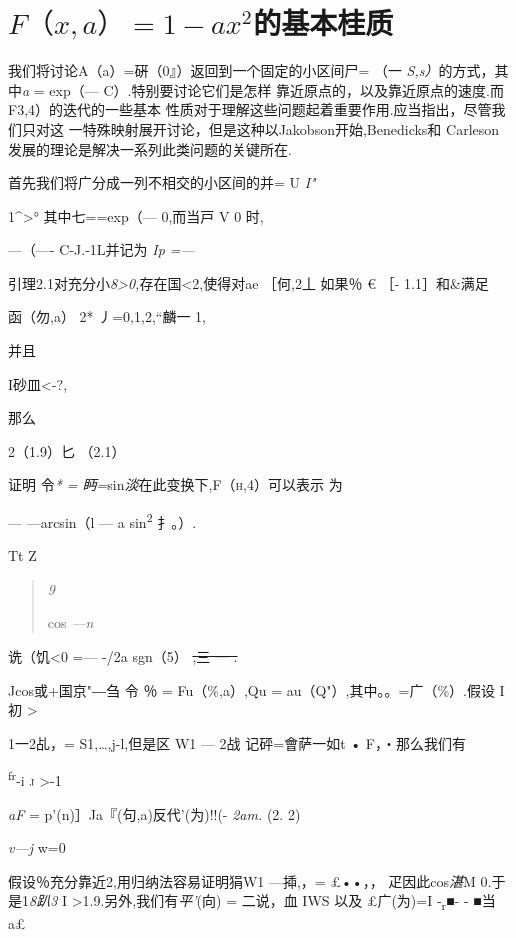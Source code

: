 \section{$ F（x,a） = 1 - ax^2$的基本桂质}


我们将讨论A（a）=硏（0』）返回到一个固定的小区间尸= （一
\emph{S,s）}的方式，其中\emph{a} = exp（--- C）.特别要讨论它们是怎样
靠近原点的，以及靠近原点的速度.而F3,4）的迭代的一些基本
性质对于理解这些问题起着重要作用.应当指出，尽管我们只对这
一特殊映射展开讨论，但是这种以Jakobson开始,Benedicks和
Carleson发展的理论是解决一系列此类问题的关键所在.

首先我们将广分成一列不相交的小区间的并= U \emph{I"}

1\^{}\textbar{}\textgreater{}° 其中七==exp（--- 0,而当戸 V 0 时,

---（---- C-J.-1L并记为 \emph{Ip =---}

引理2.1对充分小\emph{8\textgreater{}0,}存在国\textless{}2,使得对ae
［何,2丄 如果％ € ［- 1.1］和\&满足

函（勿,a）\textbar{} 2* 丿=0,1,2,``麟一 1,

并且

I砂皿\textless{}-?,

那么

2（1.9）匕 （2.1）

证明 令\emph{* = 眄=}sin\emph{淡}在此变换下\textsc{,F（h,4）}可以表示 为

--- ---arcsin（l --- a sin\textsuperscript{2} 扌。）.

Tt Z

\begin{quote}
\emph{9}

cos \emph{---n}
\end{quote}

诜（饥\textless{}0 =--- -/2a sgn（5） \sout{,三 一 .}

Jcos或+国京"―刍 令 ％ = Fu（\%,a）,Qu = au（Q"）,其中。。=广（\%）.假设
I初 \textgreater{}

1一2乩，= S1,\ldots{},j-l,但是区\textbar{} W1 --- 2战 记砰=會萨一如t •
F，・那么我们有

\textsuperscript{fr}-i \textsc{j} \textgreater{}-1

\emph{aF} = p'(n)］Ja『(句,a)反代'(为)!!(- \emph{2am.} (2. 2)

\emph{v---j} w=0

假设％充分靠近2,用归纳法容易证明\textbar{}狷W1 ---揷,，= £••，，
疋因此cos\emph{湛}M 0.于是1\emph{8趴3} I
\textgreater{}1.9.另外,我们有\emph{平'}(向) = 二说，血 IWS 以及
£广(为)=I -\textsubscript{r}■- - ■当 a£

